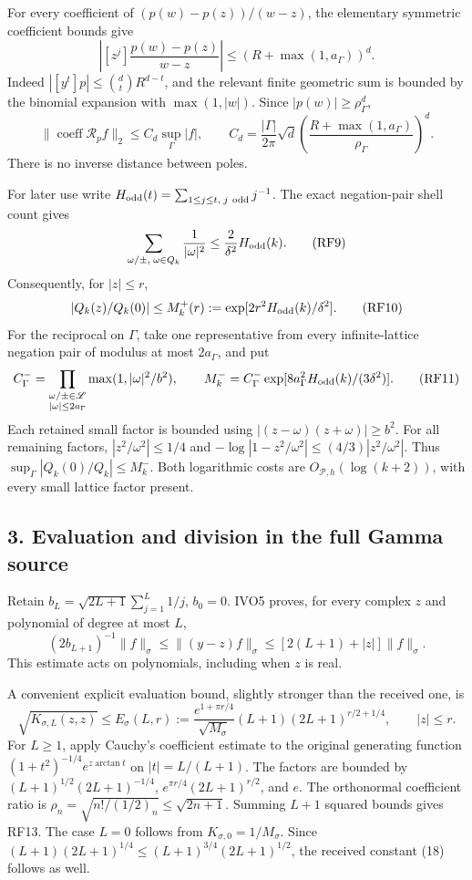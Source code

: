 \documentclass[11pt]{article}
\begin{document}
For every coefficient of \((p(w)-p(z))/(w-z)\), the elementary symmetric coefficient bounds give \[
\left|[z^j]\frac{p(w)-p(z)}{w-z}\right|
\le (R+\max(1,a_\Gamma))^d.
\] Indeed \(|[y^t]p|\le\binom dtR^{d-t}\), and the relevant finite geometric sum is bounded by the binomial expansion with \(\max(1,|w|)\). Since \(|p(w)|\ge\rho_\Gamma^d\), \[
\|\operatorname{coeff}\mathcal R_pf\|_2
\le C_d\sup_\Gamma|f|,\qquad
C_d=\frac{|\Gamma|}{2\pi}\sqrt d
\left(\frac{R+\max(1,a_\Gamma)}{\rho_\Gamma}\right)^d.
\tag{RF8}
\] There is no inverse distance between poles.

For later use write \(H_{\rm odd}(t)=\sum_{1\le j\le t,\;j\ {\rm odd}}j^{-1}\). The exact negation-pair shell count gives \[
\sum_{\omega/\pm,\;\omega\in Q_k}\frac1{|\omega|^2}
\le \frac2{\delta^2}H_{\rm odd}(k).
\tag{RF9}
\] Consequently, for \(|z|\le r\), \[
|Q_k(z)/Q_k(0)|\le M_k^+(r)
:=\exp[2r^2H_{\rm odd}(k)/\delta^2].
\tag{RF10}
\] For the reciprocal on \(\Gamma\), take one representative from every infinite-lattice negation pair of modulus at most \(2a_\Gamma\), and put \[
C_\Gamma^-=\prod_{\substack{\omega/\pm\in\mathscr L\\|\omega|\le2a_\Gamma}}
\max(1,|\omega|^2/b^2),\qquad
M_k^-=C_\Gamma^-\exp[8a_\Gamma^2H_{\rm odd}(k)/(3\delta^2)].
\tag{RF11}
\] Each retained small factor is bounded using \(|(z-\omega)(z+\omega)|\ge b^2\). For all remaining factors, \(|z^2/\omega^2|\le1/4\) and \(-\log|1-z^2/\omega^2|\le(4/3)|z^2/\omega^2|\). Thus \(\sup_\Gamma|Q_k(0)/Q_k|\le M_k^-\). Both logarithmic costs are \(O_{\mathscr P,h}(\log(k+2))\), with every small lattice factor present.

\subsection{3. Evaluation and division in the full Gamma source}\label{evaluation-and-division-in-the-full-gamma-source}

Retain \(b_L=\sqrt{2L+1}\sum_{j=1}^L1/j\), \(b_0=0\). IVO5 proves, for every complex \(z\) and polynomial of degree at most \(L\), \[
(2b_{L+1})^{-1}\|f\|_\sigma\le\|(y-z)f\|_\sigma
\le[2(L+1)+|z|]\|f\|_\sigma.
\tag{RF12}
\] This estimate acts on polynomials, including when \(z\) is real.

A convenient explicit evaluation bound, slightly stronger than the received one, is \[
\sqrt{K_{\sigma,L}(z,z)}
\le E_\sigma(L,r):=
\frac{e^{1+\pi r/4}}{\sqrt{M_\sigma}}
(L+1)(2L+1)^{r/2+1/4},\qquad |z|\le r.
\tag{RF13}
\] For \(L\ge1\), apply Cauchy's coefficient estimate to the original generating function \((1+t^2)^{-1/4}e^{z\arctan t}\) on \(|t|=L/(L+1)\). The factors are bounded by \((L+1)^{1/2}(2L+1)^{-1/4}\), \(e^{\pi r/4}(2L+1)^{r/2}\), and \(e\). The orthonormal coefficient ratio is \(\rho_n=\sqrt{n!/(1/2)_n}\le\sqrt{2n+1}\). Summing \(L+1\) squared bounds gives RF13. The case \(L=0\) follows from \(K_{\sigma,0}=1/M_\sigma\). Since \((L+1)(2L+1)^{1/4}\le(L+1)^{3/4}(2L+1)^{1/2}\), the received constant (18) follows as well.
\end{document}
